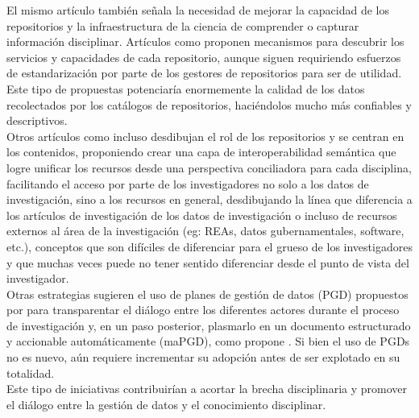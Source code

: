 \documentclass[runningheads]{llncs}
\begin{document}
El mismo artículo también señala la necesidad de mejorar la capacidad de los repositorios y la infraestructura de la ciencia de comprender o capturar información disciplinar. Artículos como \citet{ulrich_2024_10847707} proponen mecanismos para descubrir los servicios y capacidades de cada repositorio, aunque siguen requiriendo esfuerzos de estandarización por parte de los gestores de repositorios para ser de utilidad. Este tipo de propuestas potenciaría enormemente la calidad de los datos recolectados por los catálogos de repositorios, haciéndolos mucho más confiables y descriptivos.\\

Otros artículos como \citet{Vogt_2025} incluso desdibujan el rol de los repositorios y se centran en los contenidos, proponiendo crear una capa de interoperabilidad semántica que logre unificar los recursos desde una perspectiva conciliadora para cada disciplina, facilitando el  acceso por parte de los investigadores no solo a los datos de investigación, sino a los recursos en general, desdibujando la línea que diferencia a los artículos de investigación de los datos de investigación o incluso de recursos externos al área de la investigación (eg: REAs, datos gubernamentales, software, etc.), conceptos que son difíciles de diferenciar para el grueso de los investigadores y que muchas veces puede no tener sentido diferenciar desde el punto de vista del investigador.\\

Otras estrategias sugieren el uso de planes de gestión de datos (PGD) propuestos por \citet{bicarregui2012dmp} para transparentar el diálogo entre los diferentes actores durante el proceso de investigación y, en un paso posterior, plasmarlo en un documento estructurado y accionable automáticamente (maPGD), como propone \citet{simms2019_madmp}. Si bien el uso de PGDs no es nuevo, aún requiere incrementar su adopción antes de ser explotado en su totalidad.\\

Este tipo de iniciativas contribuirían a acortar la brecha disciplinaria y promover el diálogo entre la gestión de datos y el conocimiento disciplinar.\\




\end{document}
